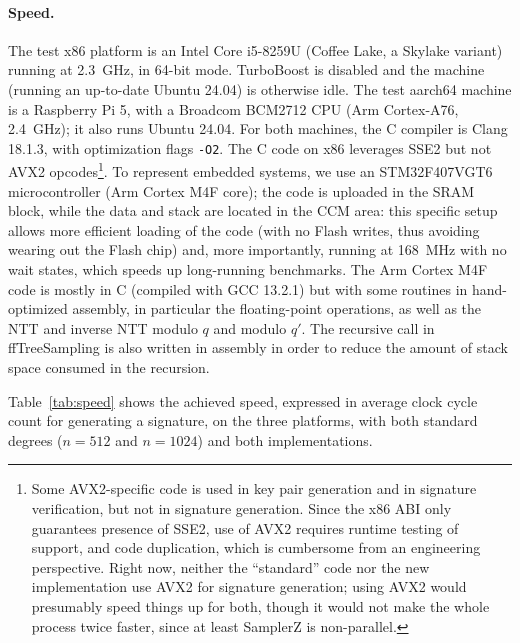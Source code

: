 \documentclass{llncs}
\begin{document}
\paragraph{Speed.}
The test x86 platform is an Intel Core i5-8259U (Coffee Lake, a Skylake
variant) running at 2.3~GHz, in 64-bit mode. TurboBoost is disabled and
the machine (running an up-to-date Ubuntu 24.04) is otherwise idle. The
test aarch64 machine is a Raspberry Pi 5, with a Broadcom BCM2712 CPU
(Arm Cortex-A76, 2.4~GHz); it also runs Ubuntu 24.04. For both machines,
the C compiler is Clang 18.1.3, with optimization flags \verb+-O2+. The
C code on x86 leverages SSE2 but not AVX2 opcodes\footnote{Some
AVX2-specific code is used in key pair generation and in signature
verification, but not in signature generation. Since the x86 ABI only
guarantees presence of SSE2, use of AVX2 requires runtime testing of
support, and code duplication, which is cumbersome from an engineering
perspective. Right now, neither the ``standard'' code nor the new
implementation use AVX2 for signature generation; using AVX2 would
presumably speed things up for both, though it would not make the whole
process twice faster, since at least \textsf{SamplerZ} is
non-parallel.}. To represent embedded systems, we use an STM32F407VGT6
microcontroller (Arm Cortex M4F core); the code is uploaded in the SRAM
block, while the data and stack are located in the CCM area: this
specific setup allows more efficient loading of the code (with no Flash
writes, thus avoiding wearing out the Flash chip) and, more importantly,
running at 168~MHz with no wait states, which speeds up long-running
benchmarks. The Arm Cortex M4F code is mostly in C (compiled with GCC
13.2.1) but with some routines in hand-optimized assembly, in particular
the floating-point operations, as well as the NTT and inverse NTT modulo
$q$ and modulo $q'$. The recursive call in \textsf{ffTreeSampling} is
also written in assembly in order to reduce the amount of stack space
consumed in the recursion.

Table~\ref{tab:speed} shows the achieved speed, expressed in
average clock cycle count for generating a signature, on the three
platforms, with both standard degrees ($n = 512$ and $n = 1024$) and
both implementations.
\end{document}
